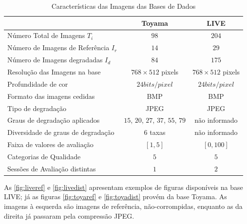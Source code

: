 \begin{table}[htb]
	\footnotesize
	\caption[Características das Imagens das Bases de Dados]{Características das Imagens das Bases de Dados}
	\label{tab:bds}
	\centering
 	\begin{tabular}{ l | c | c } %
							&	\textbf{Toyama}			&	\textbf{LIVE} 		\\\hline %
		Número Total de Imagens	$T_i$		&	$98$				&	$204$	  		\\ %
		Número de Imagens de Referência $I_r$	& 	$14$				&	$29$		  	\\
		Número de Imagens degradadas $I_d$	&	$84$				&	$175$	  		\\
		Resolução das Imagens na base		& 	$768 \times 512$ pixels 		&	$768 \times 512$ pixels 	\\
		Profundidade de cor			&	$24bits/pixel$			&	$24bits/pixel$ 		\\
		Formato das imagens cedidas		&	BMP				&	BMP		  	\\
		Tipo de degradação			&	JPEG				&	JPEG		  	\\
		Graus de degradação aplicados		& $15$, $20$, $27$, $37$, $55$, $79$ 	& 	não informado 		\\
		Diversidade de graus de degradação	&	$6$ taxas			&  	não informado 		\\
		Faixa de valores de avaliação		& 	$[1, 5]$			& 	$[0, 100]$		\\
		Categorias de Qualidade			&	$5$				& 	$5$			\\
		Sessões de Avaliação distintas		&	$1$				& 	$2$			\\
		
	\end {tabular}\par
\end{table}

As \autoref{fig:liveref} e \autoref{fig:livedist} apresentam exemplos de figuras disponíveis na base LIVE; já as figuras \autoref{fig:toyaref} e \autoref{fig:toyadist} provém da base Toyama. As imagens à esquerda são imagens de referência, não-corrompidas, enquanto as da direita já passaram pela compressão JPEG.

